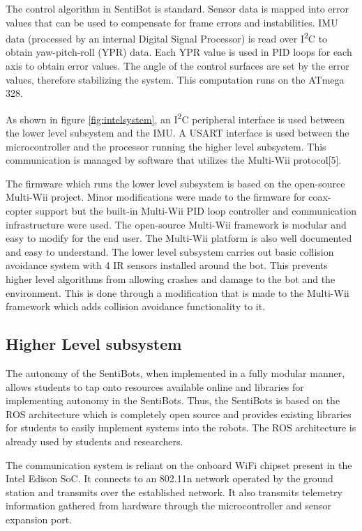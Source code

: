 \documentclass[12pt]{article}
\begin{document}
The control algorithm in SentiBot is standard. Sensor data is mapped into error values that can be used to compensate for frame errors and instabilities. IMU data (processed by an internal Digital Signal Processor) is read over I\textsuperscript{2}C to obtain yaw-pitch-roll (YPR) data. Each YPR value is used in PID loops for each axis to obtain error values. The angle of the control surfaces are set by the error values, therefore stabilizing the system. This computation runs on the ATmega 328.

As shown in figure \ref{fig:intelsystem}, an I\textsuperscript{2}C peripheral interface is used between the lower level subsystem and the IMU. A USART interface is used between the microcontroller and the processor running the higher level subsystem. This communication is managed by software that utilizes the Multi-Wii protocol[5].

The firmware which runs the lower level subsystem is based on the open-source Multi-Wii project. Minor modifications were made to the firmware for coax-copter support but the built-in Multi-Wii PID loop controller and communication infrastructure were used. The open-source Multi-Wii framework is modular and easy to modify for the end user. The Multi-Wii platform is also well documented and easy to understand. The lower level subsystem carries out basic collision avoidance system with 4 IR sensors installed around the bot. This prevents higher level algorithms from allowing crashes and damage to the bot and the environment. This is done through a modification that is made to the Multi-Wii framework which adds collision avoidance functionality to it.

\subsection{Higher Level subsystem}

The autonomy of the SentiBots, when implemented in a fully modular manner, allows students to tap onto resources available online and libraries for implementing autonomy in the SentiBots. Thus, the SentiBots is based on the ROS architecture which is completely open source and provides existing libraries for students to easily implement systems into the robots. The ROS architecture is already used by students and researchers.

The communication system is reliant on the onboard WiFi chipset present in the Intel Edison SoC. It connects to an 802.11n network operated by the ground station and transmits over the established network. It also transmits telemetry information gathered from hardware through the microcontroller and sensor expansion port.
\end{document}
